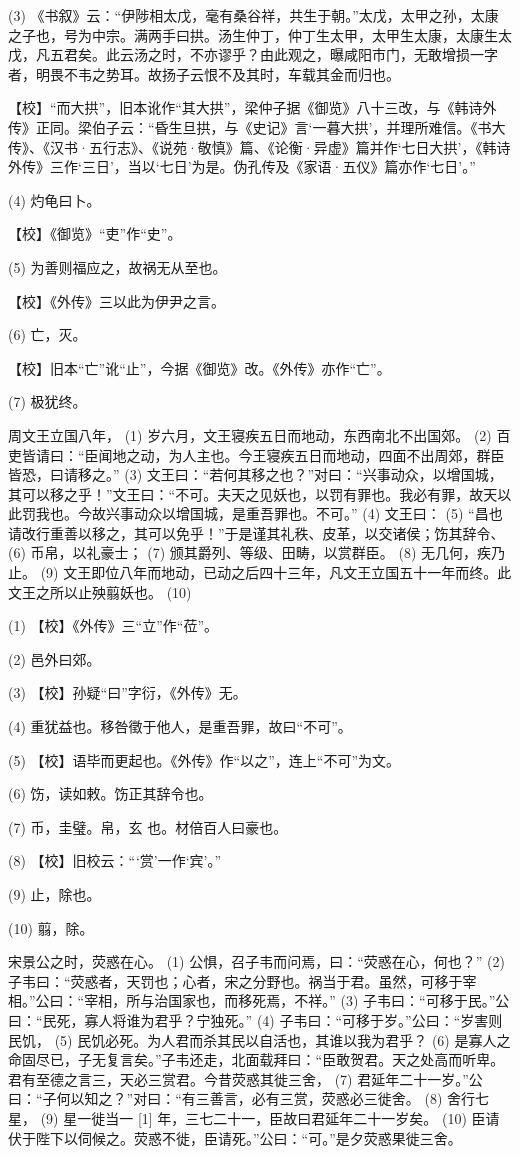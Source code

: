 \documentclass[12pt,UTF8]{ctexbook}
\begin{document}
(3) 《书叙》云：“伊陟相太戊，毫有桑谷祥，共生于朝。”太戊，太甲之孙，太康之子也，号为中宗。满两手曰拱。汤生仲丁，仲丁生太甲，太甲生太康，太康生太戊，凡五君矣。此云汤之时，不亦谬乎？由此观之，曝咸阳市门，无敢增损一字者，明畏不韦之势耳。故扬子云恨不及其时，车载其金而归也。

【校】“而大拱”，旧本讹作“其大拱”，梁仲子据《御览》八十三改，与《韩诗外传》正同。梁伯子云：“昏生旦拱，与《史记》言‘一暮大拱’，并理所难信。《书大传》、《汉书·五行志》、《说苑·敬慎》篇、《论衡·异虚》篇并作‘七日大拱’，《韩诗外传》三作‘三日’，当以‘七日’为是。伪孔传及《家语·五仪》篇亦作‘七日’。”

(4) 灼龟曰卜。

【校】《御览》“吏”作“史”。

(5) 为善则福应之，故祸无从至也。

【校】《外传》三以此为伊尹之言。

(6) 亡，灭。

【校】旧本“亡”讹“止”，今据《御览》改。《外传》亦作“亡”。

(7) 极犹终。

周文王立国八年， (1) 岁六月，文王寝疾五日而地动，东西南北不出国郊。 (2) 百吏皆请曰：“臣闻地之动，为人主也。今王寝疾五日而地动，四面不出周郊，群臣皆恐，曰请移之。” (3) 文王曰：“若何其移之也？”对曰：“兴事动众，以增国城，其可以移之乎！”文王曰：“不可。夫天之见妖也，以罚有罪也。我必有罪，故天以此罚我也。今故兴事动众以增国城，是重吾罪也。不可。” (4) 文王曰： (5) “昌也请改行重善以移之，其可以免乎！”于是谨其礼秩、皮革，以交诸侯；饬其辞令、 (6) 币帛，以礼豪士； (7) 颁其爵列、等级、田畴，以赏群臣。 (8) 无几何，疾乃止。 (9) 文王即位八年而地动，已动之后四十三年，凡文王立国五十一年而终。此文王之所以止殃翦妖也。 (10)

(1) 【校】《外传》三“立”作“莅”。

(2) 邑外曰郊。

(3) 【校】孙疑“曰”字衍，《外传》无。

(4) 重犹益也。移咎徵于他人，是重吾罪，故曰“不可”。

(5) 【校】语毕而更起也。《外传》作“以之”，连上“不可”为文。

(6) 饬，读如敕。饬正其辞令也。

(7) 币，圭璧。帛，玄 也。材倍百人曰豪也。

(8) 【校】旧校云：“‘赏’一作‘宾’。”

(9) 止，除也。

(10) 翦，除。

宋景公之时，荧惑在心。 (1) 公惧，召子韦而问焉，曰：“荧惑在心，何也？” (2) 子韦曰：“荧惑者，天罚也；心者，宋之分野也。祸当于君。虽然，可移于宰相。”公曰：“宰相，所与治国家也，而移死焉，不祥。” (3) 子韦曰：“可移于民。”公曰：“民死，寡人将谁为君乎？宁独死。” (4) 子韦曰：“可移于岁。”公曰：“岁害则民饥， (5) 民饥必死。为人君而杀其民以自活也，其谁以我为君乎？ (6) 是寡人之命固尽已，子无复言矣。”子韦还走，北面载拜曰：“臣敢贺君。天之处高而听卑。君有至德之言三，天必三赏君。今昔荧惑其徙三舍， (7) 君延年二十一岁。”公曰：“子何以知之？”对曰：“有三善言，必有三赏，荧惑必三徙舍。 (8) 舍行七星， (9) 星一徙当一 [1] 年，三七二十一，臣故曰君延年二十一岁矣。 (10) 臣请伏于陛下以伺候之。荧惑不徙，臣请死。”公曰：“可。”是夕荧惑果徙三舍。
\end{document}
